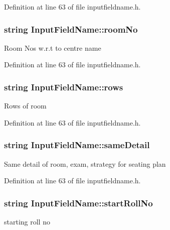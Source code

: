 Definition at line 63 of file inputfieldname.\-h.

\hypertarget{classInputFieldName_abb6b245e03e76aa29d7ef8733298e72f}{
\subsubsection[{room\-No}]{\setlength{\rightskip}{0pt plus 5cm}string Input\-Field\-Name\-::room\-No}}\label{classInputFieldName_abb6b245e03e76aa29d7ef8733298e72f}
Room Nos w.\-r.\-t to centre name 

Definition at line 63 of file inputfieldname.\-h.

\hypertarget{classInputFieldName_a1b5a819437f52b4bb6b0ea59f542f9a9}{
\subsubsection[{rows}]{\setlength{\rightskip}{0pt plus 5cm}string Input\-Field\-Name\-::rows}}\label{classInputFieldName_a1b5a819437f52b4bb6b0ea59f542f9a9}
Rows of room 

Definition at line 63 of file inputfieldname.\-h.

\hypertarget{classInputFieldName_a6de91205e7eac3168e17d100ab4d8e64}{
\subsubsection[{same\-Detail}]{\setlength{\rightskip}{0pt plus 5cm}string Input\-Field\-Name\-::same\-Detail}}\label{classInputFieldName_a6de91205e7eac3168e17d100ab4d8e64}
Same detail of room, exam, strategy for seating plan 

Definition at line 63 of file inputfieldname.\-h.

\hypertarget{classInputFieldName_a24baf5c915b4ee0fb8678e03adec043a}{
\subsubsection[{start\-Roll\-No}]{\setlength{\rightskip}{0pt plus 5cm}string Input\-Field\-Name\-::start\-Roll\-No}}\label{classInputFieldName_a24baf5c915b4ee0fb8678e03adec043a}
starting roll no 

